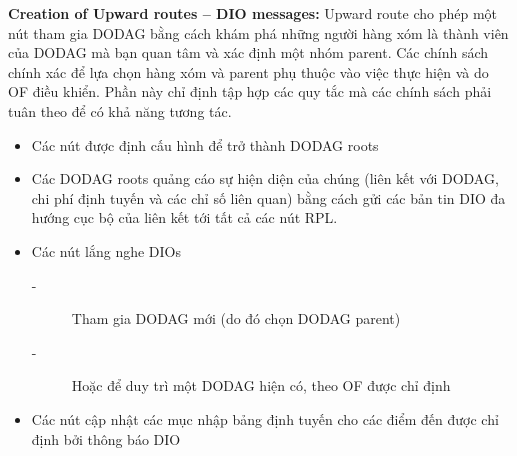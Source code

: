 \documentclass{report}
\begin{document}
\textbf{Creation of Upward routes – DIO messages:} Upward route cho phép một nút tham gia DODAG bằng cách khám phá những người hàng xóm là thành viên của DODAG mà bạn quan tâm và xác định một nhóm parent. Các chính sách chính xác để lựa chọn hàng xóm và parent phụ thuộc vào việc thực hiện và do OF điều khiển. Phần này chỉ định tập hợp các quy tắc mà các chính sách phải tuân theo để có khả năng tương tác.
\begin{itemize}
	\item Các nút được định cấu hình để trở thành DODAG roots
	\item Các DODAG roots quảng cáo sự hiện diện của chúng (liên kết với DODAG, chi phí định tuyến và các chỉ số liên quan) bằng cách gửi các bản tin DIO đa hướng cục bộ của liên kết tới tất cả các nút RPL.
	\item Các nút lắng nghe DIOs
	\begin{description}
		\item[-] Tham gia DODAG mới (do đó chọn DODAG parent)
		\item[-] Hoặc để duy trì một DODAG hiện có, theo OF được chỉ định
	\end{description}
	\item Các nút cập nhật các mục nhập bảng định tuyến cho các điểm đến được chỉ định bởi thông báo DIO
\end{itemize}
\end{document}
